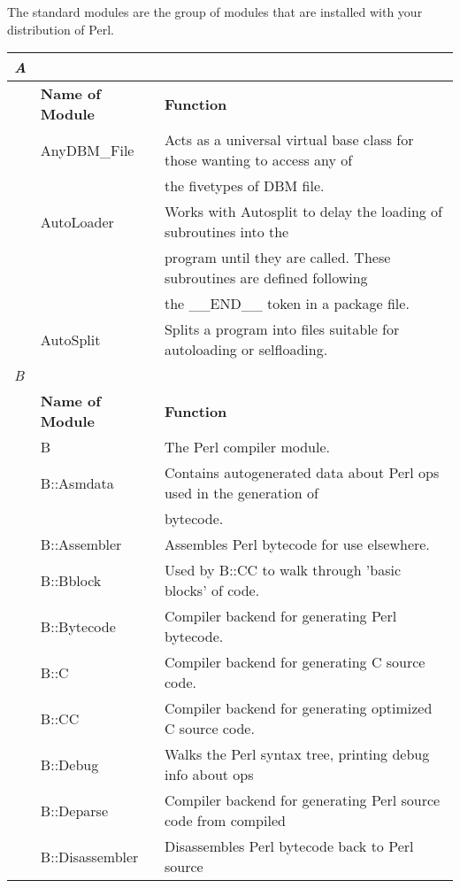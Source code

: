 \documentclass[a4paper,11pt]{book}
\begin{document}
\noindent The standard modules are the group of modules that are installed with your distribution of Perl.

\noindent 

\begin{tabular}{|p{0.2in}|p{1.0in}|p{2.9in}|} \hline 
\textit{A} &  &  \\ \hline 
 & \textbf{Name of Module} & \textbf{Function} \\ \hline 
 & AnyDBM\_File & Acts as a universal virtual base class for those wanting to access any of \\ \hline 
 &  & the fivetypes of DBM file. \\ \hline 
 & AutoLoader & Works with Autosplit to delay the loading of subroutines into the \\ \hline 
 &  & program until they are called. These subroutines are defined following \\ \hline 
 &  & the \_\_END\_\_ token in a package file. \\ \hline 
 & AutoSplit & Splits a program into files suitable for autoloading or selfloading. \\ \hline 
\newline \textit{B} &  &  \\ \hline 
 & \textbf{Name of Module} & \textbf{Function} \\ \hline 
 & B & The Perl compiler module. \\ \hline 
 & B::Asmdata & Contains autogenerated data about Perl ops used in the  generation of \\ \hline 
 &  & bytecode. \\ \hline 
 & B::Assembler & Assembles Perl bytecode for use elsewhere. \\ \hline 
 & B::Bblock & Used by B::CC to walk through 'basic blocks' of code. \\ \hline 
 & B::Bytecode & Compiler backend for generating Perl bytecode. \\ \hline 
 & B::C & Compiler backend for generating C source code. \\ \hline 
 & B::CC & Compiler backend for generating optimized C source code. \\ \hline 
 & B::Debug & Walks the Perl syntax tree, printing debug info about ops \\ \hline 
 & B::Deparse & Compiler backend for generating Perl source code from compiled \\ \hline 
 & B::Disassembler & Disassembles Perl bytecode back to Perl source \\ \hline 

\end{tabular}
\end{document}
